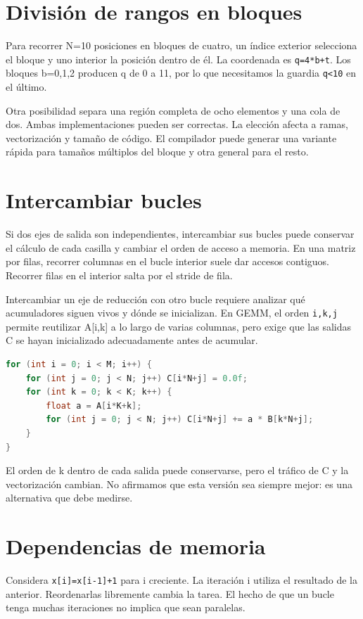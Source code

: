 \documentclass[12pt,a4paper,oneside]{report}
\begin{document}
\section{División de rangos en bloques}
Para recorrer N=10 posiciones en bloques de cuatro, un índice exterior selecciona el bloque y uno interior la posición dentro de él. La coordenada es \texttt{q=4*b+t}. Los bloques b=0,1,2 producen q de 0 a 11, por lo que necesitamos la guardia \texttt{q<10} en el último.

Otra posibilidad separa una región completa de ocho elementos y una cola de dos. Ambas implementaciones pueden ser correctas. La elección afecta a ramas, vectorización y tamaño de código. El compilador puede generar una variante rápida para tamaños múltiplos del bloque y otra general para el resto.

\section{Intercambiar bucles}
Si dos ejes de salida son independientes, intercambiar sus bucles puede conservar el cálculo de cada casilla y cambiar el orden de acceso a memoria. En una matriz por filas, recorrer columnas en el bucle interior suele dar accesos contiguos. Recorrer filas en el interior salta por el stride de fila.

Intercambiar un eje de reducción con otro bucle requiere analizar qué acumuladores siguen vivos y dónde se inicializan. En GEMM, el orden \texttt{i,k,j} permite reutilizar A[i,k] a lo largo de varias columnas, pero exige que las salidas C se hayan inicializado adecuadamente antes de acumular.

\begin{lstlisting}[language=C]
for (int i = 0; i < M; i++) {
    for (int j = 0; j < N; j++) C[i*N+j] = 0.0f;
    for (int k = 0; k < K; k++) {
        float a = A[i*K+k];
        for (int j = 0; j < N; j++) C[i*N+j] += a * B[k*N+j];
    }
}
\end{lstlisting}
El orden de k dentro de cada salida puede conservarse, pero el tráfico de C y la vectorización cambian. No afirmamos que esta versión sea siempre mejor: es una alternativa que debe medirse.

\section{Dependencias de memoria}
Considera \texttt{x[i]=x[i-1]+1} para i creciente. La iteración i utiliza el resultado de la anterior. Reordenarlas libremente cambia la tarea. El hecho de que un bucle tenga muchas iteraciones no implica que sean paralelas.
\end{document}
